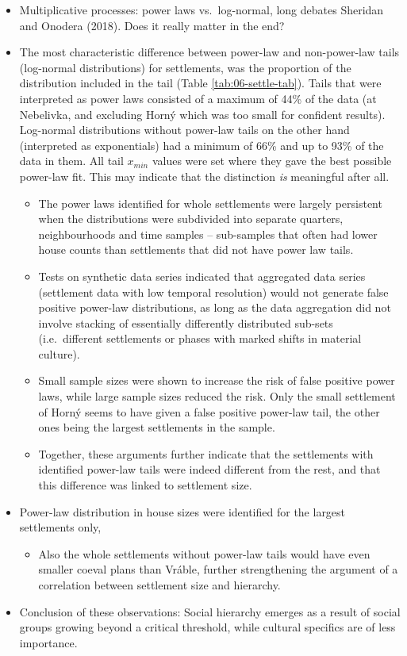 \documentclass[
  12pt,
  a4paper, twoside]{book}
\providecommand{\tightlist}{%
  \setlength{\itemsep}{0pt}\setlength{\parskip}{0pt}}
\begin{document}
\begin{itemize}
\item
  Multiplicative processes: power laws vs.~log-normal, long debates Sheridan and Onodera (2018). Does it really matter in the end?
\item
  The most characteristic difference between power-law and non-power-law tails (log-normal distributions) for settlements, was the proportion of the distribution included in the tail (Table \ref{tab:06-settle-tab}). Tails that were interpreted as power laws consisted of a maximum of 44\% of the data (at Nebelivka, and excluding Horný which was too small for confident results). Log-normal distributions without power-law tails on the other hand (interpreted as exponentials) had a minimum of 66\% and up to 93\% of the data in them. All tail \(x_{min}\) values were set where they gave the best possible power-law fit. This may indicate that the distinction \emph{is} meaningful after all.

  \begin{itemize}
  \item
    The power laws identified for whole settlements were largely persistent when the distributions were subdivided into separate quarters, neighbourhoods and time samples -- sub-samples that often had lower house counts than settlements that did not have power law tails.
  \item
    Tests on synthetic data series indicated that aggregated data series (settlement data with low temporal resolution) would not generate false positive power-law distributions, as long as the data aggregation did not involve stacking of essentially differently distributed sub-sets (i.e.~different settlements or phases with marked shifts in material culture).
  \item
    Small sample sizes were shown to increase the risk of false positive power laws, while large sample sizes reduced the risk. Only the small settlement of Horný seems to have given a false positive power-law tail, the other ones being the largest settlements in the sample.
  \item
    Together, these arguments further indicate that the settlements with identified power-law tails were indeed different from the rest, and that this difference was linked to settlement size.
  \end{itemize}
\item
  Power-law distribution in house sizes were identified for the largest settlements only,

  \begin{itemize}
  \tightlist
  \item
    Also the whole settlements without power-law tails would have even smaller coeval plans than Vráble, further strengthening the argument of a correlation between settlement size and hierarchy.
  \end{itemize}
\item
  Conclusion of these observations: Social hierarchy emerges as a result of social groups growing beyond a critical threshold, while cultural specifics are of less importance.


\end{itemize}
\end{document}
